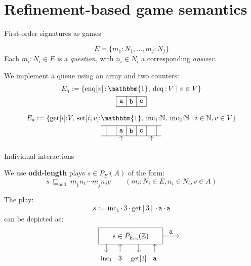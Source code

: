 \documentclass{beamer}
\newcommand{\kw}[1]{\ensuremath{ \mathrm{#1} }}
\newcommand{\deqpic}[3]{%
  \begin{tikzpicture}[scale=0.4]
    \draw (-4,-1) rectangle (4,1);
    \node (x) at (0,0) {$#1$};
    \draw[->] (-3, -1) -- (-3, -2);
    \node[anchor=base] at (-3, -3) {\small $\kw{inc}_1$};
    \draw[<-] (-1.3, -1) -- (-1.3, -2);
    \node[anchor=base] at (-1.3, -3) {$#2$};
    \draw[->] (1, -1) -- (1, -2);
    \node[anchor=base] at (1, -3) {\small $\kw{get}[#2]$};
    \draw[<-] (3, -1) -- (3, -2);
    \node[anchor=base] at (3, -3) {$#3$};
    \draw[->] (4,0) -- node[above] {$#3$} (6,0);
  \end{tikzpicture}%
}
\begin{document}

\section{Refinement-based game semantics} %

\begin{frame}{First-order signatures as games} %
  \begin{definition}[Signature]
  \[
    E = \{ m_1 : N_1, \ldots, m_j : N_j \}
  \]
  Each $m_i : N_i \in E$ is a \emph{question},
  with $n_i \in N_i$ a corresponding \emph{answer}.
  \end{definition}
  \pause
  \begin{example}
    We implement a queue using an array and two counters:
    \begin{gather*}
      E_\kw{q} := \{
        \kw{enq}[v] \mathop{:} \mathbbm{1}, \:
        \kw{deq} \mathop{:} V \mid
        v \in V \}
      \\
      \begin{tikzpicture}[scale=0.5]
        \draw (0,0) grid (3,1);
        \node at (0.5,0.5) {$\mathtt{a}$};
        \node at (1.5,0.5) {$\mathtt{b}$};
        \node at (2.5,0.5) {$\mathtt{c}$};
      \end{tikzpicture}
      \\[1ex]
      E_\kw{a} := \{
        \kw{get}[i] {:} V, \:
        \kw{set}[i,v] {:} \mathbbm{1}, \:
        \kw{inc}_1 {:} \mathbb{N}, \:
        \kw{inc}_2 {:} \mathbb{N}
        \mid i \in \mathbb{N}, v \in V \} \\
      \begin{tikzpicture}[scale=0.5]
        \draw (-0.5,0) grid (5.5,1);
        \node at (1.5,0.5) {$\mathtt{a}$};
        \node at (2.5,0.5) {$\mathtt{b}$};
        \node at (3.5,0.5) {$\mathtt{c}$};
        \draw[->] (1.5,-0.5) -- (1.5,0);
        \draw[->] (4.5,-0.5) -- (4.5,0);
      \end{tikzpicture}
    \end{gather*}
  \end{example}
\end{frame}

\begin{frame}{Individual interactions} %
\begin{definition}[Plays]
We use \textbf{odd-length} plays $s \in P_E(A)$ of the form:
\[
  s \: \sqsubseteq_\kw{odd} \:
    \underline{m}_1 n_1
    \cdots
    \underline{m}_j n_j
    \underline{v}
  \qquad
  (m_i : N_i \in E, n_i \in N_i, v \in A)
\]
\end{definition}
\pause
\begin{example}
  The play:
  \[
    s :=
    \underline{\kw{inc}_1} \cdot 3 \cdot
    \underline{\kw{get}[3]} \cdot \mathtt{a} \cdot
    \underline{\mathtt{a}}
  \]
  can be depicted as:
  \[
    \qquad
    \deqpic{s \in \bar{P}_{E_\kw{rb}}(\mathbb{Z})}{3}{\mathtt{a}}
  \]
\end{example}
\end{frame}
\end{document}
